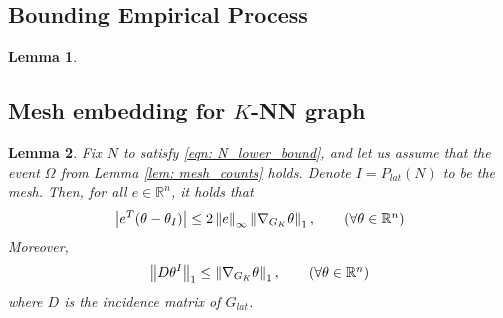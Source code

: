\documentclass{article}
\newcommand{\Reals}{\mathbb{R}}
\newcommand{\norm}[1]{\left\lVert#1\right\rVert}
\newcommand{\abs}[1]{\left \lvert #1 \right \rvert}
\theoremstyle{alden}
\theoremstyle{aldenthm}
\newtheorem{lemma}{Lemma}
\theoremstyle{definition}
\theoremstyle{remark}
\begin{document}
\subsection{Bounding Empirical Process}

\begin{lemma}
	
\end{lemma}

\subsection{Mesh embedding for $K$-NN graph}

\begin{lemma}
	Fix $N$ to satisfy \eqref{eqn: N_lower_bound}, and let us assume that the event $\Omega$ from Lemma \ref{lem: mesh_counts} holds. Denote $I = P_{lat}(N)$ to be the mesh. Then, for all $e \in \Reals^n$, it holds that
	\begin{equation*}
	\abs{e^T(\theta - \theta_I)} \leq 2 \norm{e}_{\infty} \norm{\nabla_{G_K} \theta}_1, \tag{$\forall \theta \in \Reals^n$}
	\end{equation*}
	Moreover, 
	\begin{equation*}
	\norm{D \theta^I}_1 \leq \norm{\nabla_{G_K} \theta}_1, \tag{$\forall \theta \in \Reals^n$}
	\end{equation*}
	where $D$ is the incidence matrix of $G_{lat}$.
\end{lemma}
\end{document}
